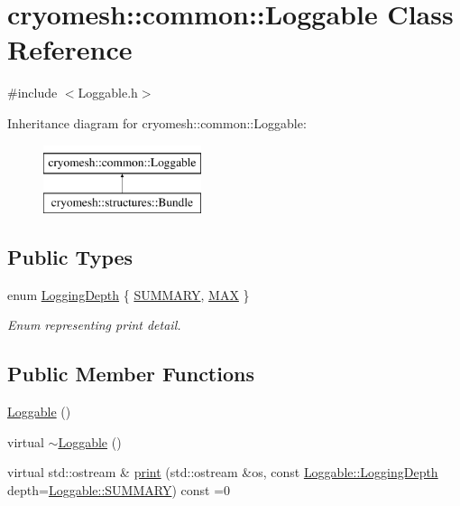 \hypertarget{classcryomesh_1_1common_1_1Loggable}{\section{cryomesh\-:\-:common\-:\-:\-Loggable \-Class \-Reference}
\label{classcryomesh_1_1common_1_1Loggable}
}


{\ttfamily \#include $<$\-Loggable.\-h$>$}

\-Inheritance diagram for cryomesh\-:\-:common\-:\-:\-Loggable\-:\begin{figure}[H]
\begin{center}
\leavevmode
\includegraphics[height=2.000000cm]{classcryomesh_1_1common_1_1Loggable}
\end{center}
\end{figure}
\subsection*{\-Public \-Types}
\begin{DoxyCompactItemize}
\item 
enum \hyperlink{classcryomesh_1_1common_1_1Loggable_a4d85401f6c81bc8ed94e49d66ae574c5}{\-Logging\-Depth} \{ \hyperlink{classcryomesh_1_1common_1_1Loggable_a4d85401f6c81bc8ed94e49d66ae574c5a51f5abcf5a53a8930a09b065fc64a44f}{\-S\-U\-M\-M\-A\-R\-Y}, 
\hyperlink{classcryomesh_1_1common_1_1Loggable_a4d85401f6c81bc8ed94e49d66ae574c5ae496af0b41e3b64530b61e315822cc51}{\-M\-A\-X}
 \}
\begin{DoxyCompactList}\small\item\em \-Enum representing print detail. \end{DoxyCompactList}\end{DoxyCompactItemize}
\subsection*{\-Public \-Member \-Functions}
\begin{DoxyCompactItemize}
\item 
\hyperlink{classcryomesh_1_1common_1_1Loggable_a52e7934753ed7cc33972ed2fc57b571c}{\-Loggable} ()
\item 
virtual \hyperlink{classcryomesh_1_1common_1_1Loggable_a8295792cec325f663f0d6c64ec960cb2}{$\sim$\-Loggable} ()
\item 
virtual std\-::ostream \& \hyperlink{classcryomesh_1_1common_1_1Loggable_a8709b369a43141412e72786dba572dfd}{print} (std\-::ostream \&os, const \hyperlink{classcryomesh_1_1common_1_1Loggable_a4d85401f6c81bc8ed94e49d66ae574c5}{\-Loggable\-::\-Logging\-Depth} depth=\hyperlink{classcryomesh_1_1common_1_1Loggable_a4d85401f6c81bc8ed94e49d66ae574c5a51f5abcf5a53a8930a09b065fc64a44f}{\-Loggable\-::\-S\-U\-M\-M\-A\-R\-Y}) const =0
\end{DoxyCompactItemize}


